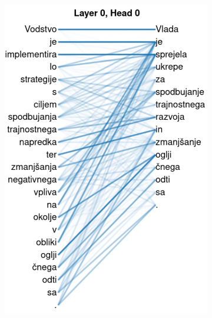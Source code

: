 \documentclass[fleqn,moreauthors,10pt]{ds_report}
\begin{document}
\begin{figure}[ht]
    \centering
    \begin{subfigure}{0.45\linewidth} %
        \centering
        \includegraphics[width=\textwidth]{t5-sen1-conn1.pdf}
        \label{fig:t5-sen1-conn1}
    \end{subfigure}
    \hfill %
    \begin{subfigure}{0.45\linewidth} %
        \centering

\end{subfigure}
\end{figure}
\end{document}
